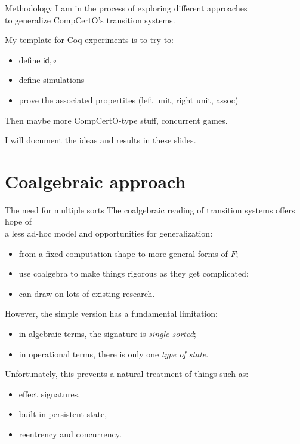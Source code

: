 \documentclass[mathserif]{beamer}
\begin{document}
\begin{frame}{Methodology}
  I am in the process of exploring different approaches \\
  to generalize CompCertO's transition systems.

  \pause
  \vfill
  My template for Coq experiments is to try to:
  \begin{itemize}
    \item define $\mathsf{id}, {\circ}$
    \item define simulations
    \item prove the associated propertites (left unit, right unit, assoc)
  \end{itemize}
  Then maybe more CompCertO-type stuff, concurrent games.

  \vfill
  I will document the ideas and results in these slides.
\end{frame}

\section{Coalgebraic approach}

\frame\sectionpage

\begin{frame}{The need for multiple sorts}
  The coalgebraic reading of transition systems offers hope of \\
  a less ad-hoc model and opportunities for generalization:
  \begin{itemize}
    \item from a fixed computation shape to more general forms of $F$;
    \item use coalgebra to make things rigorous as they get complicated;
    \item can draw on lots of existing research.
  \end{itemize}

  \pause
  \vfill
  However, the simple version has a fundamental limitation:
  \begin{itemize}
    \item in algebraic terms, the signature is \emph{single-sorted};
    \item in operational terms, there is only one \emph{type of state}.
  \end{itemize}

  \pause
  \vfill
  Unfortunately, this prevents a natural treatment of things such as:
  \begin{itemize}
    \item effect signatures,
    \item built-in persistent state,
    \item reentrency and concurrency.
  \end{itemize}
\end{frame}
\end{document}
